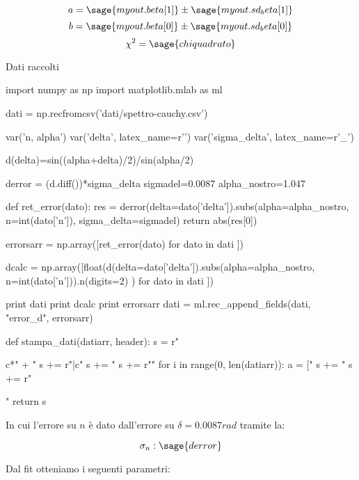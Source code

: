 $$a = \sage{myout.beta[1]} \pm \sage{myout.sd_beta[1]}$$
$$b = \sage{myout.beta[0]} \pm \sage{myout.sd_beta[0]}$$
$$ \chi^ 2 = \sage{chiquadrato}$$

Dati raccolti

\begin{sagesilent}


import numpy as np
import matplotlib.mlab as ml

dati = np.recfromcsv('dati/spettro-cauchy.csv')

var('n, alpha')
var('delta', latex_name=r'\delta')
var('sigma_delta', latex_name=r'\sigma_{\delta}')

d(delta)=sin((alpha+delta)/2)/sin(alpha/2)

derror = (d.diff())*sigma_delta
sigmadel=0.0087
alpha_nostro=1.047


def ret_error(dato):
  res = derror(delta=dato['delta']).subs(alpha=alpha_nostro, n=int(dato['n']),
                    sigma_delta=sigmadel)
  return abs(res[0])
  
errorsarr = np.array([ret_error(dato) for dato in dati ])

dcalc = np.array([float(d(delta=dato['delta']).subs(alpha=alpha_nostro, n=int(dato['n'])).n(digits=2) ) for dato in dati ])

print dati
print dcalc
print errorsarr
dati = ml.rec_append_fields(dati, "error_d", errorsarr)

def stampa_dati(datiarr, header):
  s = r"\begin{tabular}{c*{" + "%
  s += r"}{|c}}"
  s += "%
  s += r"\midrule"
  for i in range(0, len(datiarr)):
    a = ["%
    s += "%
  s += r"\end{tabular}"
  return s
\end{sagesilent}

\begin{center}
\end{center}


In cui l'errore su $n$ è dato dall'errore su $\delta = 0.0087 rad $ tramite la:

$$\sigma_n: \sage{derror}$$


Dal fit otteniamo i seguenti parametri:

